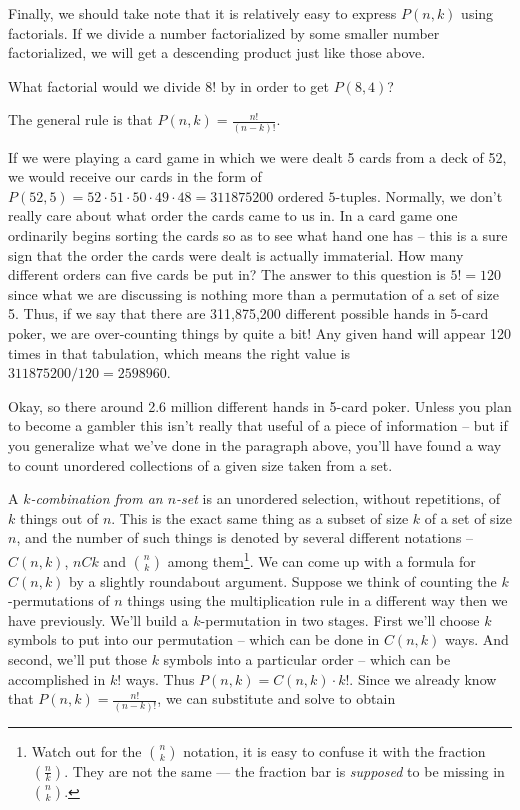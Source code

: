 Finally, we should take note that it is relatively easy to express $P(n,k)$
using factorials.  If we divide a number factorialized by some smaller 
number factorialized, we will get a descending product just like those above.

\begin{exer}
What factorial would we divide $8!$ by in order to get $P(8,4)$?
\end{exer}

The general rule is that $P(n,k) = \frac{n!}{(n-k)!}$.

If we were playing a card game in which we were dealt 5 cards from
a deck of 52, we would receive our cards in the form of 
$P(52,5) = 52 \cdot 51 \cdot 50 \cdot 49 \cdot 48 = 311875200$ ordered
$5$-tuples.  Normally, we don't really care about what order the cards
came to us in.  In a card game one ordinarily begins sorting the cards
so as to see what hand one has -- this is a sure sign that the order the
cards were dealt is actually immaterial.  How many different orders can
five cards be put in?  The answer to this question is $5! = 120$ since
what we are discussing is nothing more than a permutation of a set of
size 5.  Thus, if we say that there are 311,875,200 different possible 
hands in 5-card poker, we are over-counting things by quite a bit!  Any
given hand will appear 120 times in that tabulation, which means the 
right value is $311875200/120 = 2598960$.  

Okay, so there around 2.6 million
different hands in 5-card poker.  Unless you plan to become a gambler
this isn't really that useful of a piece of information -- but if you
generalize what we've done in the paragraph above, you'll have found
a way to count unordered collections of a given size taken from a set.

A  \emph{$k$-combination from an $n$-set} is an 
unordered selection, without repetitions, of $k$ things out of $n$.
This is the exact same thing as a subset of size $k$ of a set of size 
$n$, and the number of such things is denoted by several different 
notations -- $C(n,k)$, $nCk$ and $\displaystyle\binom{n}{k}$ among 
them\footnote{Watch out for the $\binom{n}{k}$ notation, it is easy 
to confuse it with the fraction $\left(\frac{n}{k}\right)$.  They are
not the same --- the fraction bar is \emph{supposed} to be missing
in $\binom{n}{k}$.}.  We can come
up with a formula for $C(n,k)$ by a slightly roundabout argument.
Suppose we think of counting the $k$-permutations of $n$ things using the
multiplication rule in a different way then we have previously.  We'll
build a $k$-permutation in two stages.  First we'll choose $k$ symbols
to put into our permutation -- which can be done in $C(n,k)$ ways.  And
second, we'll put those $k$ symbols into a particular order -- which
can be accomplished in $k!$ ways.  Thus $P(n,k) = C(n,k) \cdot k!$. 
Since we already know that $P(n,k) = \frac{n!}{(n-k)!}$, we can 
substitute and solve to obtain 

